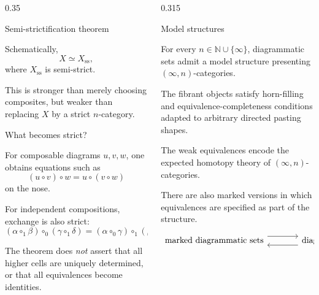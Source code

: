 \documentclass[final]{beamer}
\begin{document}
\begin{frame}[fragile, t]
\begin{columns}[t,totalwidth=\textwidth]
\begin{column}{0.35\textwidth}
\begin{alertblock}{Semi-strictification theorem}
\medskip

Schematically,
\[
  X
  \simeq
  X_{\mathrm{ss}},
\]
where $X_{\mathrm{ss}}$ is semi-strict.

\medskip

This is stronger than merely choosing composites, but weaker than
replacing $X$ by a strict $n$-category.

\end{alertblock}

\begin{block}{What becomes strict?}

For composable diagrams $u,v,w$, one obtains equations such as
\[
  (u\circ v)\circ w
  =
  u\circ(v\circ w)
\]
on the nose.

For independent compositions, exchange is also strict:
\[
  (\alpha\circ_1\beta)\circ_0(\gamma\circ_1\delta)
  =
  (\alpha\circ_0\gamma)\circ_1(\beta\circ_0\delta).
\]

\medskip

The theorem does \emph{not} assert that all higher cells are uniquely
determined, or that all equivalences become identities.

\end{block}

\end{column}


\begin{column}{0.315\textwidth}

\begin{block}{Model structures}

For every $n\in\mathbb{N}\cup\{\infty\}$, diagrammatic sets admit a
model structure presenting $(\infty,n)$-categories.

\medskip

The fibrant objects satisfy horn-filling and equivalence-completeness
conditions adapted to arbitrary directed pasting shapes.

\medskip

The weak equivalences encode the expected homotopy theory of
$(\infty,n)$-categories.

\medskip

There are also marked versions in which equivalences are specified
as part of the structure.

\begin{center}
\[
\begin{tikzcd}[column sep=large]
\text{marked diagrammatic sets}
  \arrow[r,shift left=1.2ex]
&
\text{diagrammatic sets}
  \arrow[l,shift left=1.2ex]
\end{tikzcd}
\]
\end{center}


\end{block}
\end{column}
\end{columns}
\end{frame}
\end{document}
